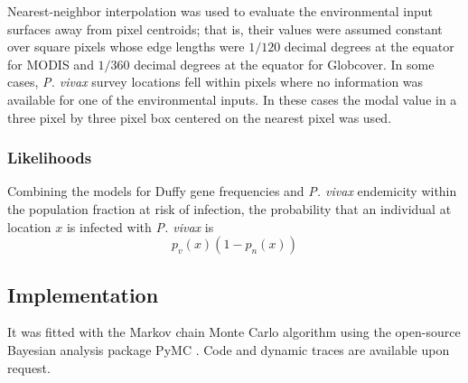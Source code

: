 Nearest-neighbor interpolation was used to evaluate the environmental input surfaces away from pixel centroids; that is, their values were assumed constant over square pixels whose edge lengths were $1/120$ decimal degrees at the equator for MODIS and $1/360$ decimal degrees at the equator for Globcover. In some cases, \emph{P. vivax} survey locations fell within pixels where no information was available for one of the environmental inputs. In these cases the modal value in a three pixel by three pixel box centered on the nearest pixel was used.

\subsubsection*{Likelihoods}
Combining the models for Duffy gene frequencies and \emph{P. vivax} endemicity within the population fraction at risk of infection, the probability that an individual at location $x$ is infected with \emph{P. vivax} is
\begin{equation}
    \label{eq:pv-like}
    p_v(x)(1-p_n(x))
\end{equation}

\subsection*{Implementation} 
It was fitted with the Markov chain Monte Carlo algorithm \cite{gilks:1995} using the open-source Bayesian analysis package PyMC \cite{pymc}. Code and dynamic traces are available upon request.